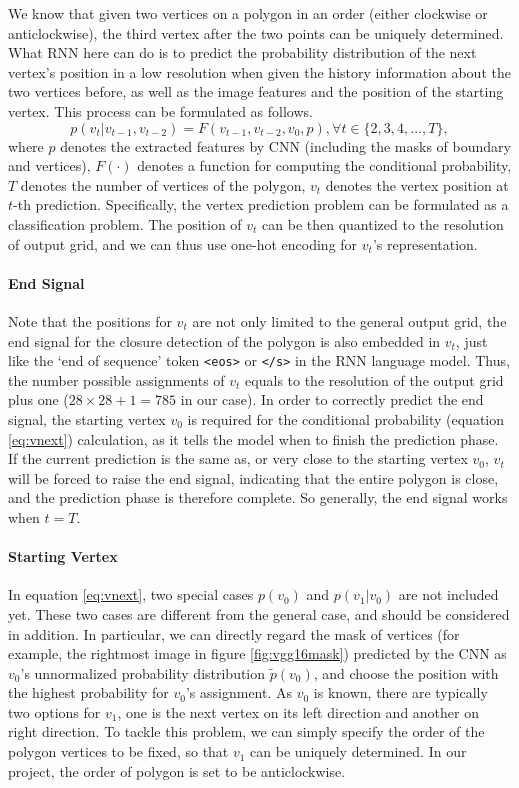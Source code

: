 We know that given two vertices on a polygon in an order (either clockwise or anticlockwise), the third vertex after the two points can be uniquely determined. What RNN here can do is to predict the probability distribution of the next vertex's position in a low resolution when given the history information about the two vertices before, as well as the image features and the position of the starting vertex. This process can be formulated as follows.
\begin{equation}\label{eq:vnext}
	p(v_t|v_{t-1}, v_{t-2}) = F(v_{t-1}, v_{t-2}, v_0, p), \forall t \in \{2,3,4,...,T\},
\end{equation}
where $p$ denotes the extracted features by CNN (including the masks of boundary and vertices), $F(\cdot)$ denotes a function for computing the conditional probability, $T$ denotes the number of vertices of the polygon, $v_t$ denotes the vertex position at $t$-th prediction. Specifically, the vertex prediction problem can be formulated as a classification problem. The position of $v_t$ can be then quantized to the resolution of output grid, and we can thus use one-hot encoding for $v_t$'s representation.

\paragraph{End Signal} Note that the positions for $v_t$ are not only limited to the general output grid, the end signal for the closure detection of the polygon is also embedded in $v_t$, just like the `end of sequence' token \lstinline{<eos>} or \lstinline{</s>} in the RNN language model. Thus, the number possible assignments of $v_t$ equals to the resolution of the output grid plus one ($28\times28+1=785$ in our case). In order to correctly predict the end signal, the starting vertex $v_0$ is required for the conditional probability (equation \ref{eq:vnext}) calculation, as it tells the model when to finish the prediction phase. If the current prediction is the same as, or very close to the starting vertex $v_0$, $v_t$ will be forced to raise the end signal, indicating that the entire polygon is close, and the prediction phase is therefore complete. So generally, the end signal works when $t=T$.

\paragraph{Starting Vertex} In equation \ref{eq:vnext}, two special cases $p(v_0)$ and $p(v_1|v_0)$ are not included yet. These two cases are different from the general case, and should be considered in addition. In particular, we can directly regard the mask of vertices (for example, the rightmost image in figure \ref{fig:vgg16mask}) predicted by the CNN as $v_0$'s unnormalized probability distribution $\tilde{p}(v_0)$, and choose the position with the highest probability for $v_0$'s assignment. As $v_0$ is known, there are typically two options for $v_1$, one is the next vertex on its left direction and another on right direction. To tackle this problem, we can simply specify the order of the polygon vertices to be fixed, so that $v_1$ can be uniquely determined. In our project, the order of polygon is set to be anticlockwise.

